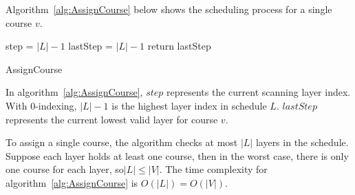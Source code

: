 \documentclass[letterpaper,12pt]{article}
\theoremstyle{definition}
\begin{document}
Algorithm~\ref{alg:AssignCourse} below shows the scheduling process for a single course $v$. 

\begin{algorithm}[H]
\DontPrintSemicolon
{}

step = $|L|-1$\;
lastStep = $|L| -1$ \;
    return lastStep\;

\caption{AssignCourse}\label{alg:AssignCourse}
\end{algorithm}
\bigskip
In algorithm~\ref{alg:AssignCourse}, $step$ represents the current scanning layer index. With 0-indexing, $|L|-1$ is the highest layer index in schedule $L$. $lastStep$ represents the current lowest valid layer for course $v$. 

To assign a single course, the algorithm checks at most $|L|$ layers in the schedule. Suppose each layer holds at least one course, then in the worst case, there is only one course for each layer, so$|L|\leq |V|$. The time complexity for  algorithm~\ref{alg:AssignCourse} is $O(|L|)=O(|V|)$. 


\end{document}
